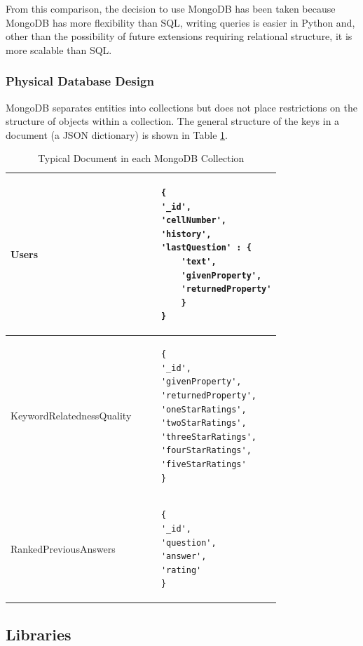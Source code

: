 \documentclass[authoryearcitations]{UoYCSproject}
\begin{document}
From this comparison, the decision to use MongoDB has been taken because MongoDB has more flexibility than SQL, writing queries is easier in Python and, other than the possibility of future extensions requiring relational structure, it is more scalable than SQL.

\subsubsection{Physical Database Design}
MongoDB separates entities into collections but does not place restrictions on the structure of objects within a collection.  The general structure of the keys in a document (a JSON dictionary) is shown in Table \ref{table:collectionStructure}.

\begin{table}
\begin{center}
    \begin{tabular}{| l | l |}
    \hline
    
    Users &
    \begin{lstlisting}
    {
    '_id',
    'cellNumber',
    'history',
    'lastQuestion' : {
        'text',
        'givenProperty',
        'returnedProperty'
        }
    }
    \end{lstlisting}
    \\ \hline
    
    KeywordRelatednessQuality &
    \begin{lstlisting}
    {
    '_id',
    'givenProperty',
    'returnedProperty',
    'oneStarRatings',
    'twoStarRatings',
    'threeStarRatings',
    'fourStarRatings',
    'fiveStarRatings'
    }
    \end{lstlisting}
    \\ \hline
    
    RankedPreviousAnswers &
    \begin{lstlisting}
    {
    '_id',
    'question',
    'answer',
    'rating'
    }
    \end{lstlisting}
    \\ \hline
    
    \end{tabular}
    \caption{Typical Document in each MongoDB Collection}
    \label{table:collectionStructure}
\end{center}
\end{table}

\subsection{Libraries}
\end{document}

